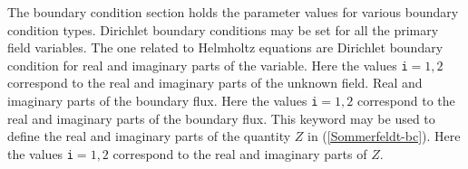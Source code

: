 The boundary condition section holds the parameter values for various
boundary condition types. Dirichlet boundary conditions may be
set for all the primary field variables. The one related to Helmholtz equations
are
\sifbegin
{} 
Dirichlet boundary condition
for real and imaginary parts of the variable.
Here the values {\tt i}$=1,2$ correspond to the real and 
imaginary parts of the unknown field.
Real and imaginary parts of the boundary flux.
Here the values {\tt i}$=1,2$ correspond to the real and 
imaginary parts of the boundary flux.
This keyword may be used to define the real and imaginary parts of
the quantity $Z$ in (\ref{Sommerfeldt-bc}).
Here the values {\tt i}$=1,2$ correspond to the real and 
imaginary parts of $Z$.
\sifend
\sifend


%
%
